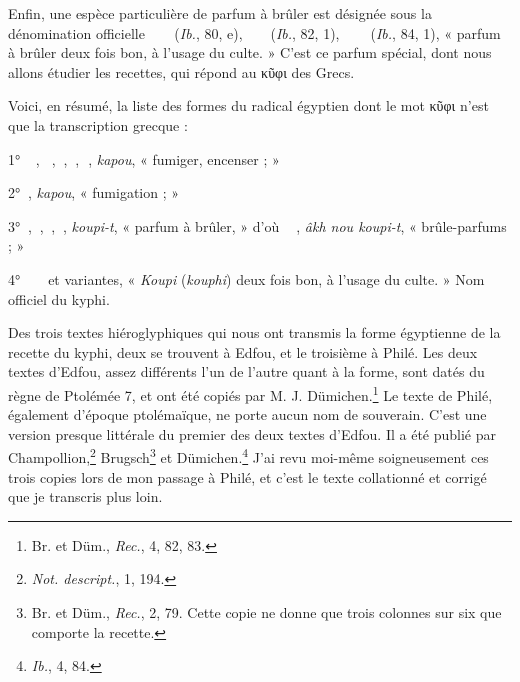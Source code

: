 \documentclass[a4paper, 11pt, oneside, landscape]{article}
\newcommand*\hieroAAAA{\raisebox{0.8ex}{}}
\newcommand*\hieroAAAB{}
\newcommand*\hieroAAAD{}
\newcommand*\hieroAAAE{}
\newcommand*\hieroAAAI{}
\newcommand*\hieroAAAK{}
\newcommand*\hieroAAAL{}
\newcommand*\hieroAAAO{}
\newcommand*\hieroAAAR{}
\newcommand*\hieroAACA{}
\newcommand*\hieroAACB{}
\newcommand*\hieroAADH{}
\newcommand*\hieroAAEC{}
\newcommand*\hieroAAED{}
\newcommand*\hieroAAEE{}
\newcommand*\hieroAAEG{}
\newcommand*\hieroAAEH{\raisebox{0.5ex}{}}
\newcommand*\hieroAAEI{}
\newcommand*\hieroAAEJ{}
\newcommand*\hieroAAEK{}
\newcommand*\hieroAAEL{}
\newcommand*\hieroAAEM{}
\newcommand*\hieroAAEN{}
\newcommand*\hieroAAEO{}
\newcommand*\hieroAAEP{\raisebox{0.5ex}{}}
\newcommand*\hieroAAEQ{}
\begin{document}
Enfin, une espèce particulière de parfum à brûler est désignée sous la dénomination officielle $\hieroAAAE\:\hieroAAAR\:\hieroAAEG\:\hieroAAEG\:\hieroAAEH\:\hieroAAAI\:\hieroAAEI$ (\emph{Ib.}, 80, e), $\hieroAAAE\:\hieroAAAR\:\hieroAAEJ\:\hieroAAEG\:\hieroAAED\:\hieroAAAI\:\hieroAAEI$ (\emph{Ib.}, 82, 1), $\hieroAAEK\:\hieroAAEL\:\hieroAAEG\:\hieroAAEG\:\hieroAAEM\:\hieroAAAI\:\hieroAAEN\:\hieroAAEO$ (\emph{Ib.}, 84, 1), « parfum à brûler deux fois bon, à l'usage du culte. » C'est ce parfum spécial, dont nous allons étudier les recettes, qui répond au κῦφι des Grecs.

Voici, en résumé, la liste des formes du radical égyptien dont le mot κῦφι n'est que la transcription grecque :

1° $\hieroAAAA\:\hieroAAAB\:\hieroAAAK\:\hieroAAAL$, $\hieroAAAA\:\hieroAAAB\:\hieroAAAO$, $\hieroAACB\:\hieroAACA$, $\hieroAAAD\:\hieroAACA$, $\hieroAAAD\:\hieroAAEP$, \emph{kapou}, « fumiger, encenser ; »

2° $\hieroAACB\:\hieroAACA$, \emph{kapou}, « fumigation ; »

3° $\hieroAADH\:\hieroAACA$, $\hieroAAEE\:\hieroAAAR$, $\hieroAAAE\:\hieroAAAR$, $\hieroAAAE\:\hieroAAEQ$, \emph{koupi-t}, « parfum à brûler, » d'où $\hieroAAEC\:\hieroAAAR\:\hieroAAED\:\hieroAAEE\:\hieroAAAR$, \emph{âkh nou koupi-t}, « brûle-parfums ; »

4° $\hieroAAAE\:\hieroAAAR\:\hieroAAEG\:\hieroAAEG\:\hieroAAED\:\hieroAAAI\:\hieroAAEI$ et variantes, « \emph{Koupi} (\emph{kouphi}) deux fois bon, à l'usage du culte. » Nom officiel du kyphi.

Des trois textes hiéroglyphiques qui nous ont transmis la forme égyptienne de la recette du kyphi, deux se trouvent à Edfou, et le troisième à Philé. Les deux textes d'Edfou, assez différents l'un de l'autre quant à la forme, sont datés du règne de Ptolémée 7, et ont été copiés par M. J. Dümichen.\footnote{Br. et Düm., \emph{Rec.}, 4, 82, 83.} Le texte de Philé, également d'époque ptolémaïque, ne porte aucun nom de souverain. C'est une version presque littérale du premier des deux textes d'Edfou. Il a été publié par Champollion,\footnote{\emph{Not. descript.}, 1, 194.} Brugsch\footnote{Br. et Düm., \emph{Rec.}, 2, 79. Cette copie ne donne que trois colonnes sur six que comporte la recette.} et Dümichen.\footnote{\emph{Ib.}, 4, 84.} J'ai revu moi-même soigneusement ces trois copies lors de mon passage à Philé, et c'est le texte collationné et corrigé que je transcris plus loin.
\end{document}
